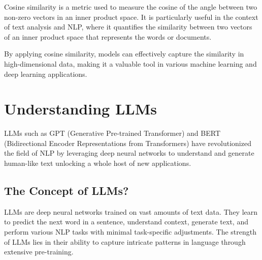 Cosine similarity is a metric used to measure the cosine of the angle between two non-zero vectors in an inner product space. It is particularly useful in the context of text analysis and NLP, where it quantifies the similarity between two vectors of an inner product space that represents the words or documents.

By applying cosine similarity, models can effectively capture the similarity in high-dimensional data, making it a valuable tool in various machine learning and deep learning applications.


\section{Understanding LLMs}
    LLMs such as GPT (Generative Pre-trained Transformer) and BERT (Bidirectional Encoder Representations from Transformers) have revolutionized the field of NLP by leveraging deep neural networks to understand and generate human-like text unlocking a whole host of new applications.


    \subsection{The Concept of LLMs?}
        LLMs are deep neural networks trained on vast amounts of text data. They learn to predict the next word in a sentence, understand context, generate text, and perform various NLP tasks with minimal task-specific adjustments. The strength of LLMs lies in their ability to capture intricate patterns in language through extensive pre-training.
       
       
